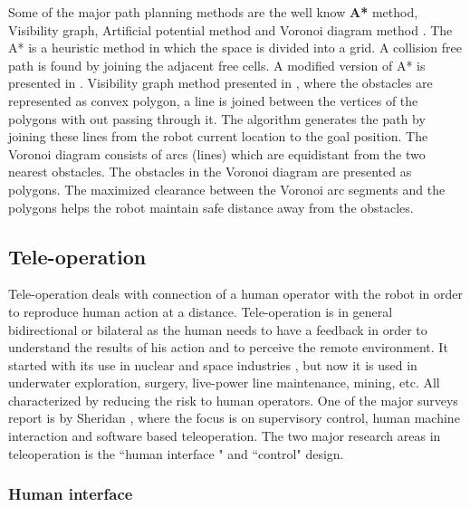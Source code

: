 Some of the major path planning methods are the well know \textbf{A*} method, Visibility graph, Artificial potential method and  Voronoi diagram method \cite{garrido2006voronoi}. The A* \cite{latombe2012robot} is a heuristic method in which the space is divided into a grid. A collision  free path is found by joining the adjacent free cells. A modified version of A* is presented in \cite{duchovn2014path}. Visibility graph method presented in \cite{nilsson1969mobile}, where the obstacles are represented as convex polygon, a line is joined between the vertices of the polygons with out passing through it. The algorithm generates the path by joining these lines from the robot current location to the goal position. The Voronoi diagram \cite{latombe2012robot, bhattacharya2008roadmap, takahashi1989motion} consists of arcs (lines) which are equidistant from the two nearest obstacles. The obstacles in the Voronoi diagram are presented as polygons. The maximized clearance between the Voronoi arc segments and the polygons helps the robot maintain safe distance away from the obstacles.  
\subsection{Tele-operation}
Tele-operation deals with  connection of a   human operator with the robot in order to reproduce human action at a distance. Tele-operation is in general bidirectional or bilateral as the human needs to have a feedback in order to understand the results of his action and to perceive the remote environment. It started with its use in nuclear and space industries \cite{martin1985teleoperated,vertut1986teleoperations}, but now it is used in underwater exploration, surgery, live-power line maintenance, mining, etc. All characterized by reducing the risk to human operators. One of the major surveys report is by Sheridan \cite{sheridan}, where the focus is on supervisory control, human machine interaction and software based teleoperation.  The two major research areas in teleoperation is the ``human interface " and ``control" design.
\subsubsection{Human interface}

